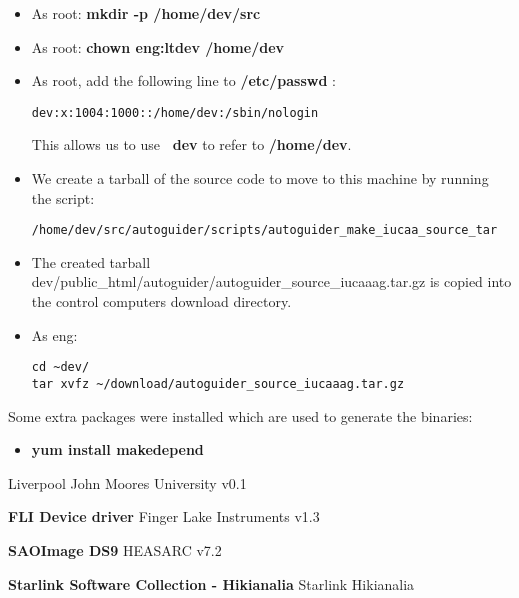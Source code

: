 \documentclass[10pt,a4paper]{article}
\begin{document}
\begin{itemize}
\item As root: {\bf mkdir -p /home/dev/src}
\item As root: {\bf chown eng:ltdev /home/dev}
\item As root, add the following line to {\bf /etc/passwd} : 
\begin{verbatim}
dev:x:1004:1000::/home/dev:/sbin/nologin
\end{verbatim}
This allows us to use {\bf ~dev} to refer to {\bf /home/dev}.
\item We create a tarball of the source code to move to this machine by running the script:
\begin{verbatim}
/home/dev/src/autoguider/scripts/autoguider_make_iucaa_source_tar
\end{verbatim}
\item The created tarball \mytilde dev/public\_html/autoguider/autoguider\_source\_iucaaag.tar.gz is copied into the control computers download directory.
\item As eng:
\begin{verbatim}
cd ~dev/
tar xvfz ~/download/autoguider_source_iucaaag.tar.gz
\end{verbatim}
\end{itemize}

Some extra packages were installed which are used to generate the binaries:

\begin{itemize}
\item {\bf yum install makedepend}
\end{itemize}

\begin{thebibliography}{99}

Liverpool John Moores University   v0.1

 {\bf FLI Device driver}
Finger Lake Instruments  v1.3

 {\bf SAOImage DS9}
HEASARC  v7.2

 {\bf Starlink Software Collection - Hikianalia}
Starlink  Hikianalia

\end{thebibliography}
\end{document}
